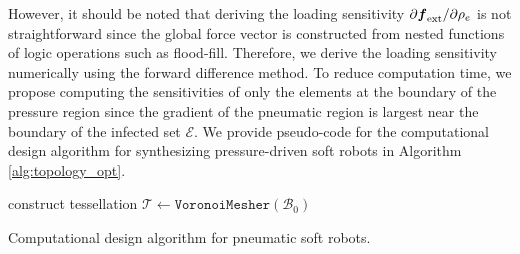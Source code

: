 \noindent However, it should be noted that deriving the loading sensitivity $\partial \boldsymbol{f}_{\textrm{ext}}/\partial \rho_e$ is not straightforward since the global force vector is constructed from nested functions of logic operations such as flood-fill. Therefore, we derive the loading sensitivity numerically using the forward difference method. To reduce computation time, we propose computing the sensitivities of only the elements at the boundary of the pressure region since the gradient of the pneumatic region is largest near the boundary of the infected set $\mathcal{E}$. We provide pseudo-code for the computational design algorithm for synthesizing pressure-driven soft robots in Algorithm \ref{alg:topology_opt}. 

\begin{algorithm}[!h]
  construct tessellation $\mathcal{T} \gets {\texttt{VoronoiMesher}}(\mathcal{B}_0)$\;
  \caption{Computational design algorithm for pneumatic soft robots.\label{alg:topology_opt}}
\end{algorithm}
\clearpage

